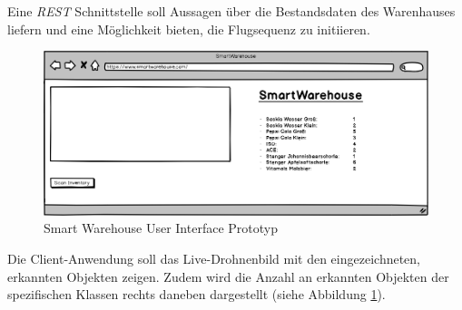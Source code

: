 \newpage

Eine \textit{REST} Schnittstelle soll Aussagen über die Bestandsdaten des Warenhauses liefern und eine Möglichkeit bieten, die Flugsequenz zu initiieren.

\begin{figure}[H]
	\begin{center}
		\includegraphics[width=15cm]{Bilder/UI.png} 
		\caption[Smart Warehouse User Interface Prototyp]{Smart Warehouse User Interface Prototyp}
		\label{ui}
	\end{center}
\end{figure}

Die Client-Anwendung soll das Live-Drohnenbild mit den eingezeichneten, erkannten Objekten zeigen. Zudem wird die Anzahl an erkannten Objekten der spezifischen Klassen rechts daneben dargestellt (siehe Abbildung \ref{ui}). 